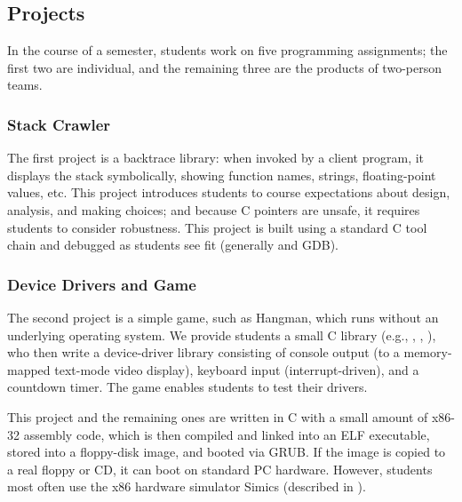 \subsection{Projects}

In the course of a semester, students work on five
programming assignments; the first two are individual,
and the remaining three are the products of two-person
teams.

\subsubsection{Stack Crawler}

The first project is a backtrace library: %
when invoked by a client program, it displays the
stack symbolically,
showing function names, strings, floating-point values, etc.
This project
introduces students to course expectations about
design, analysis, and making choices;
and
because C pointers are unsafe, it requires students
to consider robustness.
%
This project is built using a standard C tool chain
and debugged as students see fit (generally  and GDB).

\subsubsection{Device Drivers and Game}

The second project is a simple game, such as Hangman,
which runs without an underlying
operating system.
We provide students a small C library %
(e.g., , , ),
who then write a device-driver library consisting of
console output (to a memory-mapped text-mode video display),
keyboard input (interrupt-driven),
and a countdown timer.
The game enables students to test their drivers.
%
%

This project and the remaining ones are written in
C with a small amount of x86-32 assembly code,
which is then
compiled and linked into an ELF executable,
stored into a %
floppy-disk image,
and booted via GRUB.
If the image is copied to a real floppy or CD,
it can boot on standard PC hardware.
However, students most often use
the x86 hardware simulator
Simics \cite{simics} (described in \sect{\ref{sec:simics}}).

